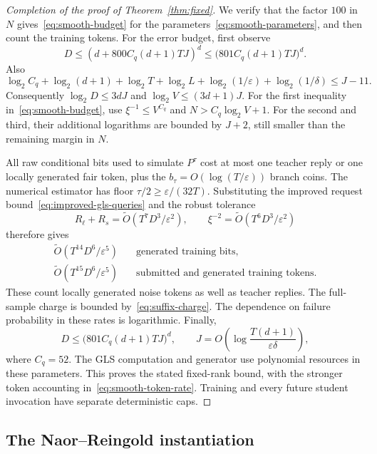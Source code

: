 \documentclass[11pt]{article}
\theoremstyle{definition}
\theoremstyle{remark}
\begin{document}
\begin{proof}[Completion of the proof of Theorem~\ref{thm:fixed}]
We verify that the factor $100$ in $N$ gives~\eqref{eq:smooth-budget} for the parameters~\eqref{eq:smooth-parameters}, and then count the training tokens.
For the error budget, first observe
\[
D\le(d+800C_q(d+1)TJ)^d
\le\bigl(801C_q(d+1)TJ\bigr)^d.
\]
Also
\[
\log_2C_q+\log_2(d+1)+\log_2T+\log_2L+
\log_2(1/\varepsilon)+\log_2(1/\delta)\le J-11.
\]
Consequently $\log_2D\le3dJ$ and $\log_2V\le(3d+1)J$. For the first inequality in~\eqref{eq:smooth-budget}, use $\xi^{-1}\le V^{C_q}$ and
$N>C_q\log_2V+1$. For the second and third, their additional logarithms are bounded by $J+2$, still smaller than the remaining margin in $N$.

All raw conditional bits used to simulate $P^\tau$ cost at most one teacher reply or one locally generated fair token, plus the $b_\tau=O(\log(T/\varepsilon))$ branch coins. The numerical estimator has floor $\tau/2\ge\varepsilon/(32T)$. Substituting the improved request bound~\eqref{eq:improved-gls-queries} and the robust tolerance
\[
R_\ell+R_s=\widetilde O(T^7D^3/\varepsilon^2),
\qquad
\xi^{-2}=\widetilde O(T^6D^3/\varepsilon^2)
\]
therefore gives
\begin{equation}\label{eq:smooth-token-rate}
\begin{aligned}
\widetilde O(T^{14}D^6/\varepsilon^5)
&\quad\text{generated training bits},\\
\widetilde O(T^{15}D^6/\varepsilon^5)
&\quad\text{submitted and generated training tokens}.
\end{aligned}
\end{equation}
These count locally generated noise tokens as well as teacher replies. The full-sample charge is bounded by~\eqref{eq:suffix-charge}. The dependence on failure probability in these rates is logarithmic. Finally,
\[
D\le\bigl(801C_q(d+1)TJ\bigr)^d,\qquad
J=O\!\left(\log\frac{T(d+1)}{\varepsilon\delta}\right),
\]
where $C_q=52$. The GLS computation and generator use polynomial resources in these parameters. This proves the stated fixed-rank bound, with the stronger token accounting in~\eqref{eq:smooth-token-rate}. Training and every future student invocation have separate deterministic caps.
\end{proof}

\subsection{The Naor--Reingold instantiation}\label{sec:nr-details}
\end{document}
